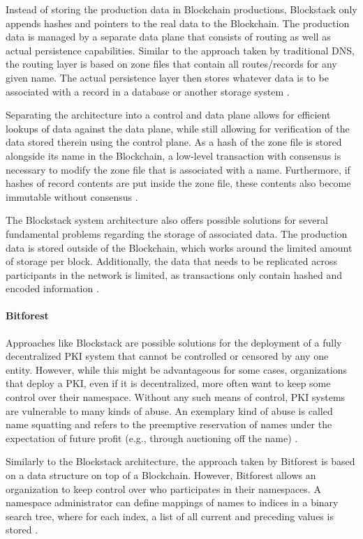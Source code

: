 Instead of storing the production data in Blockchain productions, Blockstack only appends hashes and pointers to the real data to the Blockchain. The production data is managed by a separate data plane that consists of routing as well as actual persistence capabilities. Similar to the approach taken by traditional DNS, the routing layer is based on zone files that contain all routes/records for any given name. The actual persistence layer then stores whatever data is to be associated with a record in a database or another storage system \cite{ali_blockstack:_2016}.

Separating the architecture into a control and data plane allows for efficient lookups of data against the data plane, while still allowing for verification of the data stored therein using the control plane. As a hash of the zone file is stored alongside its name in the Blockchain, a low-level transaction with consensus is necessary to modify the zone file that is associated with a name. Furthermore, if hashes of record contents are put inside the zone file, these contents also become immutable without consensus \cite{ali_blockstack:_2016}.

The Blockstack system architecture also offers possible solutions for several fundamental problems regarding the storage of associated data. The production data is stored outside of the Blockchain, which works around the limited amount of storage per block. Additionally, the data that needs to be replicated across participants in the network is limited, as transactions only contain hashed and encoded information \cite{ali_blockstack:_2016}.

\paragraph{Bitforest}

Approaches like Blockstack are possible solutions for the deployment of a fully decentralized PKI system that cannot be controlled or censored by any one entity. However, while this might be advantageous for some cases, organizations that deploy a PKI, even if it is decentralized, more often want to keep some control over their namespace. Without any such means of control, PKI systems are vulnerable to many kinds of abuse. An exemplary kind of abuse is called name squatting and refers to the preemptive reservation of names under the expectation of future profit (e.g., through auctioning off the name) \cite{dong_bitforest:_2018}.

Similarly to the Blockstack architecture, the approach taken by Bitforest is based on a data structure on top of a Blockchain. However, Bitforest allows an organization to keep control over who participates in their namespaces. A namespace administrator can define mappings of names to indices in a binary search tree, where for each index, a list of all current and preceding values is stored \cite{dong_bitforest:_2018}.

